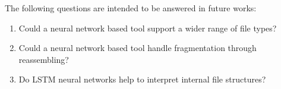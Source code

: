 The following questions are intended to be answered in future works: 

\begin{enumerate}[itemindent=\parindent,label=\textbf{Q\arabic*.}]

    \item Could a neural network based tool support a wider range of file types?
    
    \item Could a neural network based tool handle fragmentation through reassembling?
    

    \item Do LSTM neural networks help to interpret internal file structures?

\end{enumerate}
